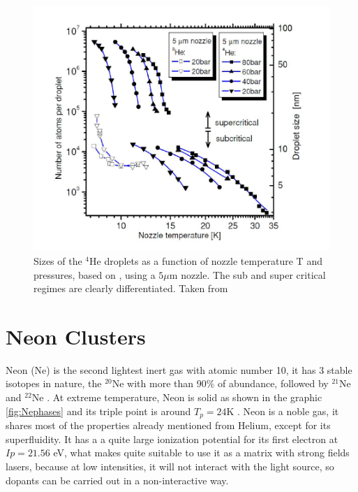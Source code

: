 \begin{figure}[h!]
\centering
\label{img:dropletSize}
\includegraphics[scale=0.4]{../Images/sizes_regimen.PNG}
\caption[Expansion droplets Regimens]{Sizes of the $^{4}$He droplets  as a function of nozzle temperature T and  pressures, based on \cite{toennies_spectroscopy_1998}, using a $5 \mu $m nozzle. The sub and super critical regimes are clearly differentiated. Taken from \cite{stienkemeier_spectroscopy_2006}}
\end{figure}

\section{Neon Clusters}

Neon (Ne) is the second lightest inert gas with atomic number 10, it has 3 stable isotopes in nature, the $^{20}$Ne with more than 90$\%$ of abundance, followed by $^{21}$Ne and  $^{22}$Ne \cite{meija_atomic_2016}. At extreme temperature, Neon is solid as shown in the graphic \ref{fig:Nephases} and its triple point is around $T_{p}=24$K \cite{young_phase_nodate}. Neon is a noble gas, it shares most of the properties already mentioned from Helium, except for its superfluidity.  It has a a quite large ionization potential for its first electron at $Ip=21.56$ eV, what makes quite suitable to use it as a matrix with strong fields lasers, because at low intensities, it will not interact with the light source, so dopants can be carried out in a non-interactive way.
  

